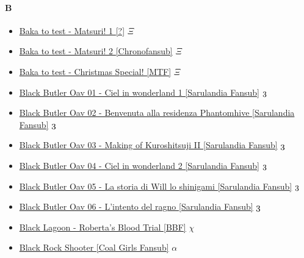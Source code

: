 		\paragraph{B} \hypertarget{OB}{}
			\begin{itemize}
				\item \href{https://mega.nz/#F!WodSzJZB!Q321W69srY0JdriWwnvy8w} {Baka to test - Matsuri! 1 [?]}  $\Xi$ \\
				\item \href{https://mega.nz/#F!QKAUmDyT!5hIeAmBm1nEyzgPaFGBTwA} {Baka to test - Matsuri! 2 [Chronofansub]}  $\Xi$ \\
				\item \href{https://mega.nz/#!JPpT1I5K!-kS68SWeeY2GgK6t2ReWZ4lzHXixbBDonlO75fVJ96I} {Baka to test - Christmas Special! [MTF]}  $\Xi$ \\
				\item \href{https://mega.nz/#!nPpG0ZzR!spHmr0_1vTQiMnHNZr4pH_aKXK1XHAiV1OWpmUdFkwk} {Black Butler Oav 01 - Ciel in wonderland 1 [Sarulandia Fansub]}  $\oldstylenums{3}$ \\
				\item \href{https://mega.nz/#!rP4g3IwI!jJDRCXB72abQ-mF9DmvuVj0dSEeLLPcFaQj6ZHplC0o} {Black Butler Oav 02 - Benvenuta alla residenza Phantomhive [Sarulandia Fansub]}  $\oldstylenums{3}$ \\
				\item \href{https://mega.nz/#!LS5BhJRD!xq7ivH7BsO74BxEHctVlmi68Oxm8DowmMmB12I4ak9U} {Black Butler Oav 03 - Making of Kuroshitsuji II [Sarulandia Fansub]}  $\oldstylenums{3}$ \\
				\item \href{https://mega.nz/#!uXoTHaIQ!BjKhI-GGlHbb0QPcZ1FkdgF-wdUgKwz1G1WA07Ms4FY} {Black Butler Oav 04 - Ciel in wonderland 2 [Sarulandia Fansub]}  $\oldstylenums{3}$ \\
				\item \href{https://mega.nz/#!LOpTwZiK!zVoXOVwi7WapZuAvZSA79pE5th_bzIgeE7eTdth_Ex8} {Black Butler Oav 05 - La storia di Will lo shinigami [Sarulandia Fansub]}  $\oldstylenums{3}$ \\
				\item \href{https://mega.nz/#!mSIhERAC!HJZrHggYxLTRlrRDsXDLOaKCzJiUZZEg1knLK2sDKwc} {Black Butler Oav 06 - L'intento del ragno [Sarulandia Fansub]}  $\oldstylenums{3}$ \\
				\item \href{https://mega.nz/#F!WodSzJZB!Q321W69srY0JdriWwnvy8w} {Black Lagoon - Roberta's Blood Trial [BBF]}  $\chi$ \\
				\item \href{https://mega.nz/#!YJFwjBDQ!nQmJZRGThExreULbIINiy12U0sSA2XbURFQAhj3yA7Y} {Black Rock Shooter [Coal Girls Fansub]}  $\alpha$ \\ 
		
			
			\end{itemize}	
			
